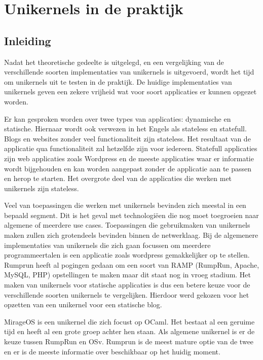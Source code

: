 \documentclass[pdftex,a4paper,12pt,twoside]{report}
\begin{document}
\chapter{Unikernels in de praktijk}
\label{ch:unikernels_praktijk}

\section{Inleiding}

Nadat het theoretische gedeelte is uitgelegd, en een vergelijking van de verschillende soorten implementaties van unikernels is uitgevoerd, wordt het tijd om unikernels uit te testen in de praktijk. De huidige implementaties van unikernels geven een zekere vrijheid wat voor soort applicaties er kunnen opgezet worden. 

Er kan gesproken worden over twee types van applicaties: dynamische en statische. Hiernaar wordt ook verwezen in het Engels als stateless en statefull. Blogs en websites zonder veel functionaliteit zijn stateless. Het resultaat van de applicatie qua functionaliteit zal hetzelfde zijn voor iedereen. Statefull applicaties zijn web applicaties zoals Wordpress en de meeste applicaties waar er informatie wordt bijgehouden en kan worden aangepast zonder de applicatie aan te passen en herop te starten. Het overgrote deel van de applicaties die werken met unikernels zijn stateless.

Veel van toepassingen die werken met unikernels bevinden zich meestal in een bepaald segment. Dit is het geval met technologiëen die nog moet toegroeien naar algemene of meerdere use cases. Toepassingen die gebruikmaken van unikernels maken zullen zich grotendeels bevinden binnen de netwerklaag. Bij de algemenere implementaties van unikernels die zich gaan focussen om meerdere programmeertalen is een applicatie zoals wordpress gemakkelijker op te stellen. Rumprun heeft al pogingen gedaan om een soort van RAMP (RumpRun, Apache, MySQL, PHP) opstellingen te maken maar dit staat nog in vroeg stadium. Het maken van unikernels voor statische applicaties is dus een betere keuze voor de verschillende soorten unikernels te vergelijken. Hierdoor werd gekozen voor het opzetten van een unikernel voor een statische blog.

MirageOS is een unikernel die zich focust op OCaml. Het bestaat al een geruime tijd en heeft al een grote groep achter hen staan. Als algemene unikernel is er de keuze tussen RumpRun en OSv. Rumprun is de meest mature optie van de twee en er is de meeste informatie over beschikbaar op het huidig moment.
\end{document}
